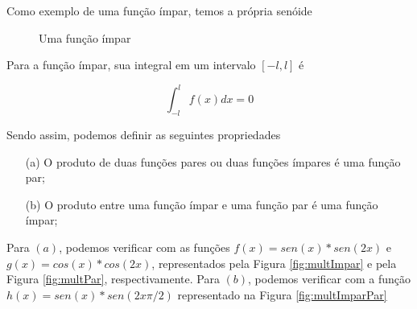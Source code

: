 Como exemplo de uma função ímpar, temos a própria senóide
\begin{figure}[H]
\begin{center}
    \caption{Uma função ímpar}
    \label{fig:funcImpar}
\end{center}
\end{figure}

Para a função ímpar, sua integral em um intervalo $[-l,l]$ é

\begin{equation}
\label{eq:intImpar}
    \int_{-l}^{l} f(x)dx = 0
\end{equation}

Sendo assim, podemos definir as seguintes propriedades \\
\begin{definicao}
\label{def:opPar}
    \begin{enumerate}
        \item[(a)] O produto de duas funções pares ou duas funções ímpares 
        é uma função par;
        \item[(b)] O produto entre uma função ímpar e uma função par é uma 
        função ímpar;
    \end{enumerate}
\end{definicao}

Para $(a)$, podemos verificar com as funções $f(x) = sen(x) *  sen(2x)$ e 
$g(x) = cos(x) * cos(2x)$, representados pela Figura \ref{fig:multImpar}
e pela Figura \ref{fig:multPar}, respectivamente. Para $(b)$, podemos 
verificar com a função $h(x) = sen(x) * sen(2x\pi/2)$ representado na 
Figura \ref{fig:multImparPar}


